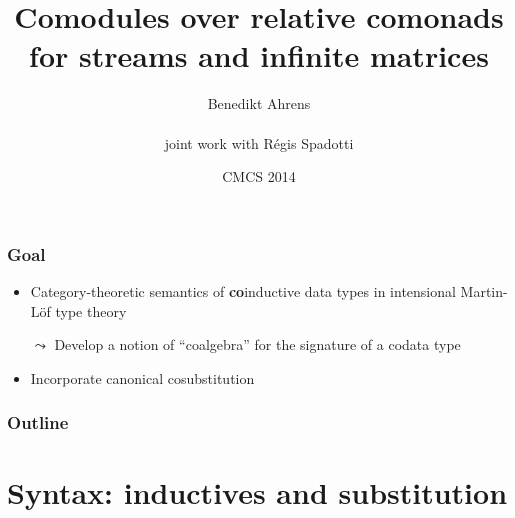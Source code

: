 \documentclass[
]
{beamer}
\title[Comodules over relative comonads]{Comodules over relative comonads \\ for streams and infinite matrices}
\author[B.\ Ahrens and R.\ Spadotti]{Benedikt Ahrens \\~\\ joint work with R\'egis Spadotti}
\date[2014-04-05/06]{CMCS 2014}
\institute[IRIT] %
{%
  Institut de Recherche en Informatique de Toulouse\\
   Universit\'e Paul Sabatier\\ ~ \\
}
\newcommand{\fat}[1]{\textbf{#1}}
\begin{document}
\begin{frame}
 \titlepage
\end{frame}


\begin{frame}
 \frametitle{Goal}
 
   \begin{itemize}\setlength{\itemsep}{1em}
    \item Category-theoretic semantics of \fat{co}inductive data types
          in intensional Martin-L\"of type theory
    \item [$\leadsto$] Develop a notion of \enquote{coalgebra} for the signature of a codata type
    \item Incorporate canonical cosubstitution
   \end{itemize}


 
\end{frame}


\begin{frame}
 \frametitle{Outline}
 \tableofcontents
\end{frame}


\section{Syntax: inductives and substitution}

\begin{comment}
\begin{frame}
 \frametitle{Starting point: W-types in Martin-L\"of TT}
 
  
 \begin{block}{Well-founded trees as \fat{initial algebra} of polynomial functor}
 
  \begin{itemize}
   \item Trees specified by $A$ and $x:A\vdash B(x)$
   
   \item Type of natural numbers $\mathbb{N} := W~A~B$ with: \[A = \{O,S\}, \quad B(O) = \{\}, \quad B(S)=\{*\}\]
 
   \item The type $W~A~B$ is the (carrier of) the initial algebra of
    \[X \mapsto \sum_{a:A}X^{B(a)} \]
 
 
   
   \item Dybjer '97, Moerdijk and Palmgren '00
  \end{itemize}
 \end{block}
\end{frame}
\end{comment}
\end{document}
